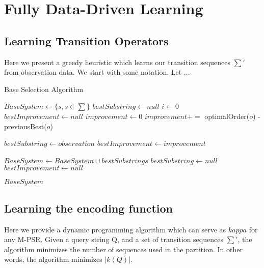 \section{Fully Data-Driven Learning}

\subsection{Learning Transition Operators}

Here we present a greedy heuristic which learns our transition sequences $\sum'$ from observation data. We start with some notation. Let ... 

\begin{algorithm}
\caption{Base Selection Algorithm}
\label{Base Selection}
\begin{algorithmic}[1]
\State $BaseSystem \gets \{s, s \in \sum \}$
\State $bestSubstring \gets null$
\State $i\gets 0$\
\State $bestImprovement \gets null$
		\State $improvement \gets 0$
			$improvement +=$ optimalOrder($o$) - previousBest($o$)
		\EndFor
		
			\State $bestSubstring \gets observation$
			\State $bestImprovement \gets improvement$
		\EndIf
		
	\EndFor

	\State $BaseSystem \gets BaseSystem \cup bestSubstrings$
	\State $bestSubstring \gets null$
	\State $bestImprovement \gets null$

\EndWhile
\Return $BaseSystem$
\EndProcedure
\end{algorithmic}
\end{algorithm}

\subsection{Learning the encoding function}

Here we provide a dynamic programming algorithm which can serve as $kappa$ for any M-PSR. Given a query string Q, and a set of transition sequences $\sum'$, the algorithm minimizes the number of sequences used in the partition. In other words, the algorithm minimizes $|k(Q)|$.

